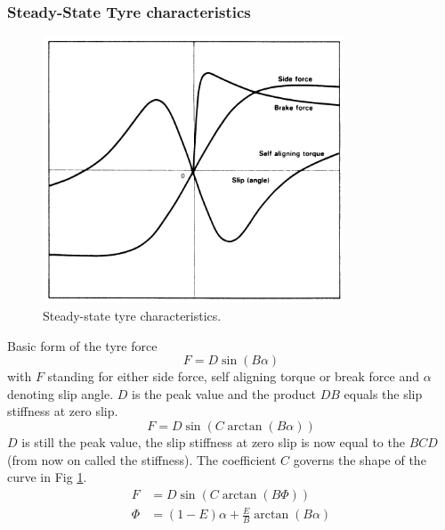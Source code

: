 \documentclass{beamer}
\begin{document}
\begin{frame}
	\frametitle{Steady-State Tyre characteristics}
	\begin{figure}
		\centering
		\includegraphics[width=0.80\textwidth,keepaspectratio]{images/Steady-State-Tyre-Characteristics.pdf}
		\caption{Steady-state tyre characteristics.}
		\label{fig_02:steady_state_tyre_characteristics}
	\end{figure}
\end{frame}

\begin{frame}
	Basic form of the tyre force
	\begin{equation}
	\label{eqn:simple_tire_force}
	F = D\sin(B\alpha)
	\end{equation}
	with $F$ standing for either side force, self aligning torque or break force and $\alpha$ denoting slip angle. $D$ is the peak value and the product $DB$ equals the slip stiffness at zero slip.
	\begin{equation}
	\label{eqn:modified_tire_force}
	F = D\sin(C\arctan(B\alpha))
	\end{equation}
	$D$ is still the peak value, the slip stiffness at zero slip is now equal to the $BCD$ (from now on called the stiffness). The coefficient $C$ governs the shape of the curve in Fig \ref{fig_02:steady_state_tyre_characteristics}.
	\begin{subequations} 
		\label{eqn:modified_tire_with_force_side_force_char}
		\begin{align} 
		F &= D\sin(C\arctan(B\Phi)) \\
		\Phi &= (1-E)\alpha + \frac{E}{B}\arctan(B\alpha)
		\end{align} 
	\end{subequations}
\end{frame}
\end{document}
